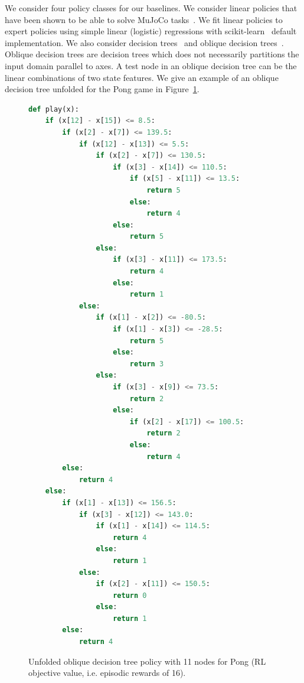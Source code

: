 We consider four policy classes for our baselines.
We consider linear policies that have been shown to be able to solve MuJoCo tasks~\cite{empirical-evidence}.
We fit linear policies to expert policies using simple linear (logistic) regressions with scikit-learn~\cite{scikit-learn} default implementation.
We also consider decision trees~\cite{breiman1984clasification} and oblique decision trees~\cite{murthy1994system}.
Oblique decision trees are decision trees which does not necessarily partitions the input domain parallel to axes.
A test node in an oblique decision tree can be the linear combinations of two state features.
We give an example of an oblique decision tree unfolded for the Pong game in Figure~\ref{lst:pong}.
\begin{figure}
  \centering
  \begin{minipage}{0.47\textwidth}
  \begin{lstlisting}[language=Python,style=mystyle]
  def play(x):
    if (x[12] - x[15]) <= 8.5:
        if (x[2] - x[7]) <= 139.5:
            if (x[12] - x[13]) <= 5.5:
                if (x[2] - x[7]) <= 130.5:
                    if (x[3] - x[14]) <= 110.5:
                        if (x[5] - x[11]) <= 13.5:
                            return 5
                        else:
                            return 4
                    else:
                        return 5
                else:
                    if (x[3] - x[11]) <= 173.5:
                        return 4
                    else:
                        return 1
            else:
                if (x[1] - x[2]) <= -80.5:
                    if (x[1] - x[3]) <= -28.5:
                        return 5
                    else:
                        return 3
                else:
                    if (x[3] - x[9]) <= 73.5:
                        return 2
                    else:
                        if (x[2] - x[17]) <= 100.5:
                            return 2
                        else:
                            return 4
        else:
            return 4
    else:
        if (x[1] - x[13]) <= 156.5:
            if (x[3] - x[12]) <= 143.0:
                if (x[1] - x[14]) <= 114.5:
                    return 4
                else:
                    return 1
            else:
                if (x[2] - x[11]) <= 150.5:
                    return 0
                else:
                    return 1
        else:
            return 4
  \end{lstlisting}
  \caption{Unfolded oblique decision tree policy with 11 nodes for Pong (RL objective value, i.e. episodic rewards of 16).}\label{lst:pong}

\end{minipage}
\end{figure}
